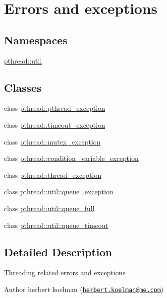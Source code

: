 \hypertarget{group__exception}{}\section{Errors and exceptions}
\label{group__exception}
\subsection*{Namespaces}
\begin{DoxyCompactItemize}
\item 
 \hyperlink{namespacepthread_1_1util}{pthread\+::util}
\end{DoxyCompactItemize}
\subsection*{Classes}
\begin{DoxyCompactItemize}
\item 
class \hyperlink{classpthread_1_1pthread__exception}{pthread\+::pthread\+\_\+exception}
\item 
class \hyperlink{classpthread_1_1timeout__exception}{pthread\+::timeout\+\_\+exception}
\item 
class \hyperlink{classpthread_1_1mutex__exception}{pthread\+::mutex\+\_\+exception}
\item 
class \hyperlink{classpthread_1_1condition__variable__exception}{pthread\+::condition\+\_\+variable\+\_\+exception}
\item 
class \hyperlink{classpthread_1_1thread__exception}{pthread\+::thread\+\_\+exception}
\item 
class \hyperlink{classpthread_1_1util_1_1queue__exception}{pthread\+::util\+::queue\+\_\+exception}
\item 
class \hyperlink{classpthread_1_1util_1_1queue__full}{pthread\+::util\+::queue\+\_\+full}
\item 
class \hyperlink{classpthread_1_1util_1_1queue__timeout}{pthread\+::util\+::queue\+\_\+timeout}
\end{DoxyCompactItemize}


\subsection{Detailed Description}
Threading related errors and exceptions \begin{DoxyAuthor}{Author}
herbert koelman (\href{mailto:herbert.koelman@me.com}{\tt herbert.\+koelman@me.\+com}) 
\end{DoxyAuthor}
